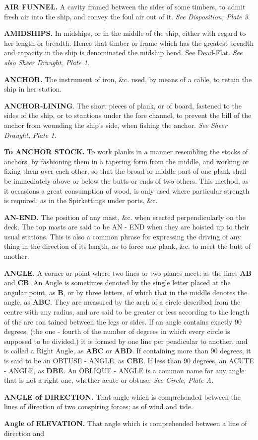\textbf{AIR FUNNEL.} A cavity framed between the sides of some timbers, to admit fresh air into the ship, and convey the foul air out of it. \textit{See Disposition, Plate 3}. 

\textbf{AMIDSHIPS.} In midships, or in the middle of the ship, either with regard to her length or breadth. Hence that timber or frame which has the greatest breadth and capacity in the ship is denominated the midship bend. See Dead-Flat. \textit{See also Sheer Draught, Plate 1}. 

\textbf{ANCHOR.} The instrument of iron, \&c. used, by means of a cable, to retain the ship in her station. 

\textbf{ANCHOR-LINING}. The short pieces of plank, or of board, fastened to the sides of the ship, or to stantions under the fore channel, to prevent the bill of the anchor from wounding the ship's side, when fishing the anchor. \textit{See Sheer Draught, Plate 1.} 

\textbf{To ANCHOR STOCK.} To work planks in a manner resembling the stocks of anchors, by fashioning them in a tapering form from the middle, and working or fixing them over each other, so that the broad or middle part of one plank shall be immediately above or below the butts or ends of two others. This method, as it occasions a great consumption of wood, is only used where particular strength is required, as in the Spirkettings under ports, \&c. 

\textbf{AN-END.} The position of any mast, \&c. when erected perpendicularly on the deck. The top masts are said to be AN - END when they are hoisted up to their usual stations. This is also a common phrase for expressing the driving of any thing in the direction of its length, as to force one plank, \&c. to meet the butt of another. 

\textbf{ANGLE.} A corner or point where two lines or two planes meet; as the lines \textbf{AB} and \textbf{CB}. An Angle is sometimes denoted by the single letter placed at the angular point, as \textbf{B}, or by three letters, of which that in the middle denotes the angle, as \textbf{ABC}. They are measured by the arch of a circle described from the centre with any radius, and are said to be greater or less according to the length of the arc con tained between the legs or sides. If an angle contains exactly 90 degrees, (the one - fourth of the number of degrees in which every circle is supposed to be divided,) it is formed by one line per pendicular to another, and is called a Right Angle, as \textbf{ABC} or \textbf{ABD}. If containing more than 90 degrees, it is said to be an OBTUSE - ANGLE, as \textbf{CBE}. If less than 90 degrees, an ACUTE - ANGLE, as \textbf{DBE}. An OBLIQUE - ANGLE is a common name for any angle that is not a right one, whether acute or obtuse. \textit{See Circle, Plate A.} 
	
	\textbf{ANGLE of DIRECTION.} That angle which is comprehended between the lines of direction of two conspiring forces; as of wind and tide. 

	\textbf{Angle of ELEVATION.} That angle which is comprehended between a line of direction and
